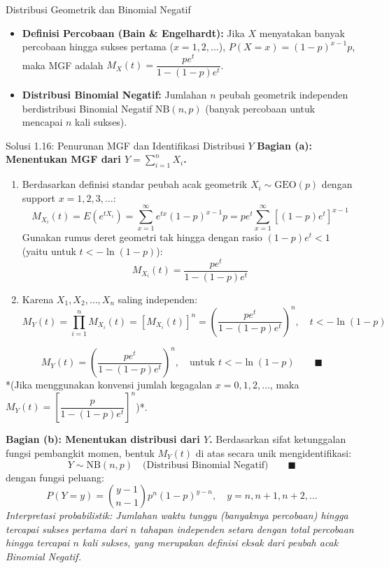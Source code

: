 \documentclass[10pt,twoside]{article}
\begin{document}
\begin{tipbox}{Distribusi Geometrik dan Binomial Negatif}
\begin{itemize}
  \item \textbf{Definisi Percobaan (Bain \& Engelhardt):} Jika $X$ menyatakan banyak percobaan hingga sukses pertama ($x = 1, 2, \dots$), $P(X=x) = (1-p)^{x-1}p$, maka MGF adalah $M_X(t) = \dfrac{pe^t}{1 - (1-p)e^t}$.
  \item \textbf{Distribusi Binomial Negatif:} Jumlahan $n$ peubah geometrik independen berdistribusi Binomial Negatif $\text{NB}(n, p)$ (banyak percobaan untuk mencapai $n$ kali sukses).
\end{itemize}
\end{tipbox}

\begin{solbox}{Solusi 1.16: Penurunan MGF dan Identifikasi Distribusi $Y$}
\textbf{Bagian (a): Menentukan MGF dari $Y = \sum_{i=1}^n X_i$.}
\begin{enumerate}[label=\arabic*.]
  \item Berdasarkan definisi standar peubah acak geometrik $X_i \sim \text{GEO}(p)$ dengan support $x = 1, 2, 3, \dots$:
  \[
  M_{X_i}(t) = E(e^{tX_i}) = \sum_{x=1}^\infty e^{tx} (1-p)^{x-1} p = p e^t \sum_{x=1}^\infty [(1-p)e^t]^{x-1}
  \]
  Gunakan rumus deret geometri tak hingga dengan rasio $(1-p)e^t < 1$ (yaitu untuk $t < -\ln(1-p)$):
  \[
  M_{X_i}(t) = \frac{p e^t}{1 - (1-p)e^t}
  \]
  \item Karena $X_1, X_2, \dots, X_n$ saling independen:
  \[
  M_Y(t) = \prod_{i=1}^n M_{X_i}(t) = \left[M_{X_i}(t)\right]^n = \left(\frac{p e^t}{1 - (1-p)e^t}\right)^n, \quad t < -\ln(1-p)
  \]
\end{enumerate}

\[
\boxed{M_Y(t) = \left(\frac{p e^t}{1 - (1-p)e^t}\right)^n, \quad \text{untuk } t < -\ln(1-p)} \qquad \blacksquare
\]
*(Jika menggunakan konvensi jumlah kegagalan $x = 0, 1, 2, \dots$, maka $M_Y(t) = \left[\dfrac{p}{1 - (1-p)e^t}\right]^n$)*.

\textbf{Bagian (b): Menentukan distribusi dari $Y$.}
Berdasarkan sifat ketunggalan fungsi pembangkit momen, bentuk $M_Y(t)$ di atas secara unik mengidentifikasi:
\[
\boxed{Y \sim \text{NB}(n, p) \quad \text{(Distribusi Binomial Negatif)}} \qquad \blacksquare
\]
dengan fungsi peluang:
\[
P(Y = y) = \binom{y - 1}{n - 1} p^n (1-p)^{y-n}, \quad y = n, n+1, n+2, \dots
\]
\textit{Interpretasi probabilistik: Jumlahan waktu tunggu (banyaknya percobaan) hingga tercapai sukses pertama dari $n$ tahapan independen setara dengan total percobaan hingga tercapai $n$ kali sukses, yang merupakan definisi eksak dari peubah acak Binomial Negatif.}
\end{solbox}
\end{document}
